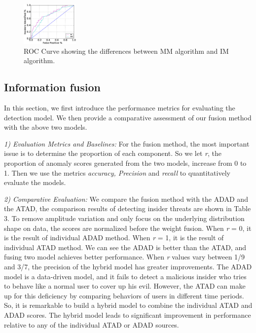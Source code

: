 \documentclass[conference]{IEEEtran}
\begin{document}
\begin{figure}[htb]
\centerline{\includegraphics[width = 0.25\textwidth]{figure/figure7.eps}}
\caption{ROC Curve showing the differences between MM algorithm and IM algorithm.}
\label{fig}
\end{figure}


\subsection{Information fusion}
In this section,  we first introduce the performance metrics for evaluating the detection model.
We then provide a comparative assessment of our fusion method with the above two models.

\emph{1) Evaluation Metrics and Baselines:}
For the fusion method, the most important issue is to determine the proportion of each component. So we let \emph{r}, the proportion of anomaly scores generated from the two models, increase from 0 to 1. Then we use the metrics \emph{accuracy, Precision} and \emph{recall} to quantitatively evaluate the models.

\emph{2) Comparative Evaluation:} 
We compare the fusion method with the ADAD and the ATAD, the comparison results of detecting insider threats are shown in Table 3.
To remove amplitude variation and only focus on the underlying distribution shape on data, the scores are normalized before the weight fusion. When \emph{r} = 0, it is the result of individual ADAD method. When \emph{r} = 1, it is the result of individual ATAD method. We can see the ADAD is better than the ATAD, and fusing two model achieves better performance. When \emph{r} values vary between 1/9 and 3/7, the precision of the hybrid model has greater improvements. The ADAD model is a data-driven model, and it fails to detect a malicious insider who tries to behave like a normal user to cover up his evil. However, the ATAD can make up for this deficiency by comparing behaviors of users in different time periods. So, it is remarkable to build a hybrid model to combine the individual ATAD and ADAD scores. The hybrid model leads to significant improvement in performance relative to any of the individual ATAD or ADAD sources.
\end{document}
